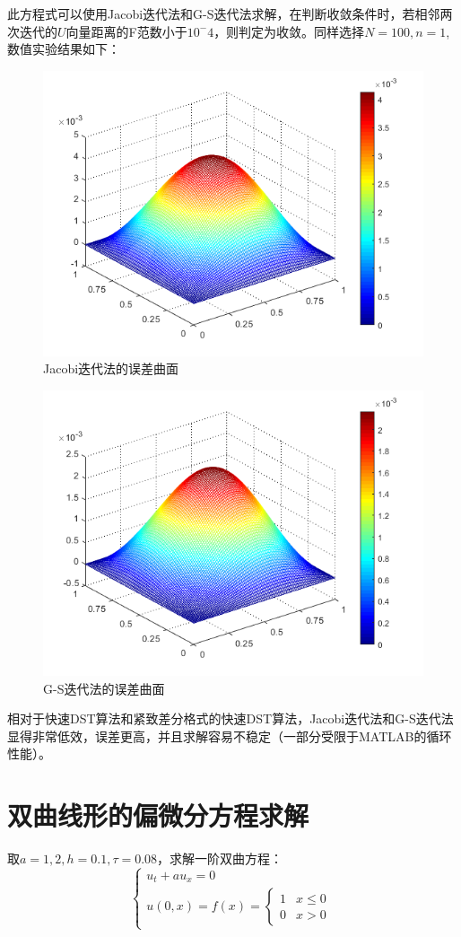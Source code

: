 \documentclass[fontset=mac]{ctexart}
\begin{document}
	此方程式可以使用Jacobi迭代法和G-S迭代法求解，在判断收敛条件时，若相邻两次迭代的$U$向量距离的F范数小于$10^-4$，则判定为收敛。同样选择$N=100,n=1$,数值实验结果如下：
	\begin{figure}[H]
		\centering
		\includegraphics[width=0.7\linewidth]{fig/psjacobi}
		\caption{Jacobi迭代法的误差曲面}
	\end{figure}
	\begin{figure}[H]
		\centering
		\includegraphics[width=0.7\linewidth]{fig/psgs}
		\caption{G-S迭代法的误差曲面}
	\end{figure}
	相对于快速DST算法和紧致差分格式的快速DST算法，Jacobi迭代法和G-S迭代法显得非常低效，误差更高，并且求解容易不稳定（一部分受限于MATLAB的循环性能）。
	
	\newpage
	\section{双曲线形的偏微分方程求解}
	取$a=1,2,h=0.1,\tau = 0.08$，求解一阶双曲方程：
	$$\left\{\begin{array}{l}u_{t}+a u_{x}=0 \\ u(0, x)=f(x)=\left\{\begin{array}{ll}1 & x \leq 0 \\ 0 & x>0\end{array}\right.\end{array}\right.$$
	
\end{document}
